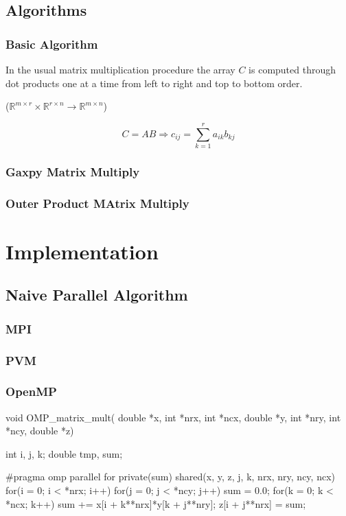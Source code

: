 \subsection{Algorithms}

\subsubsection{Basic Algorithm}

In the usual matrix multiplication procedure the array $C$ is computed
through dot products one at a time from left to right and top to
bottom order.

 ($\mathbb{R}^{m \times r} \times
\mathbb{R}^{r \times n} \to \mathbb{R}^{m \times n}$)

$$ C = AB \Longrightarrow c_{ij} = \sum_{k=1}^r a_{ik}b_{kj} $$


\subsubsection{Gaxpy Matrix Multiply}

\subsubsection{Outer Product MAtrix Multiply}


\section{Implementation}

\subsection{Naive Parallel Algorithm}

\subsubsection{MPI}
\subsubsection{PVM}
\subsubsection{OpenMP}

\begin{Scode}
void OMP_matrix_mult( double *x, int *nrx, int *ncx,
		      double *y, int *nry, int *ncy,
		      double *z) {
  int i, j, k;
  double tmp, sum;

#pragma omp parallel for private(sum) shared(x, y, z, j, k, nrx, nry, ncy, ncx)
  for(i = 0; i < *nrx; i++)
    for(j = 0; j < *ncy; j++){
      sum = 0.0;
      for(k = 0; k < *ncx; k++) 
	sum += x[i + k**nrx]*y[k + j**nry];
      z[i + j**nrx] = sum;
    }
}
\end{Scode}

